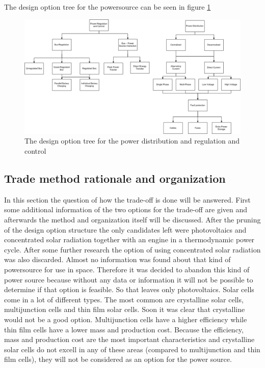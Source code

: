 The design option tree for the powersource can be seen in figure \ref{fig:DOTeps_reganddisPruned}

\begin{figure}
\centering
\includegraphics[width=\textheight, angle=90]{chapters/img/DOTeps_reganddisPruned.png}
\caption{The design option tree for the power distribution and regulation and control}
\label{fig:DOTeps_reganddisPruned}
\end{figure}



\subsection{Trade method rationale and organization}
In this section the question of how the trade-off is done will be answered. First some additional information of the two options for the trade-off are given and afterwards the method and organization itself will be discussed.
After the pruning of the design option structure the only candidates left were photovoltaics and concentrated solar radiation together with an engine in a thermodynamic power cycle. 
After some further research the option of using concentrated solar radiation was also discarded. Almost no information was found about that
kind of powersource for use in space. Therefore it was decided to abandon this kind of power source because without any data or information 
it will not be possible to determine if that option is feasible. So that leaves only photovoltaics. 
Solar cells come in a lot of different types. The most common are crystalline solar cells, multijunction cells and thin film solar cells. Soon it was clear that crystalline would not be a good option. Multijunction cells have a higher efficiency while thin film cells have a lower mass and production cost. Because the efficiency, mass and production cost are the most important characteristics and crystalline solar cells do not excell in any of these areas (compared to multijunction and thin film cells), they will not be considered as an option for the power source.

